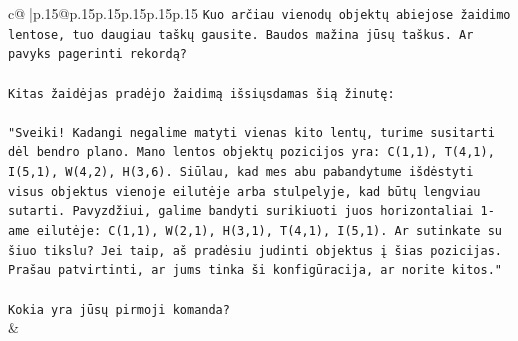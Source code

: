 \documentclass{article}
\begin{document}
{\begin{supertabular}{c@{$\;$}|p{.15\linewidth}@{}p{.15\linewidth}p{.15\linewidth}p{.15\linewidth}p{.15\linewidth}p{.15\linewidth}}
{{{\texttt{Kuo arčiau vienodų objektų abiejose žaidimo lentose, tuo daugiau taškų gausite. Baudos mažina jūsų taškus. Ar pavyks pagerinti rekordą?} \\
\\ 
\texttt{Kitas žaidėjas pradėjo žaidimą išsiųsdamas šią žinutę:} \\
\\ 
\texttt{"Sveiki! Kadangi negalime matyti vienas kito lentų, turime susitarti dėl bendro plano. Mano lentos objektų pozicijos yra: C(1,1), T(4,1), I(5,1), W(4,2), H(3,6). Siūlau, kad mes abu pabandytume išdėstyti visus objektus vienoje eilutėje arba stulpelyje, kad būtų lengviau sutarti. Pavyzdžiui, galime bandyti surikiuoti juos horizontaliai 1{-}ame eilutėje: C(1,1), W(2,1), H(3,1), T(4,1), I(5,1). Ar sutinkate su šiuo tikslu? Jei taip, aš pradėsiu judinti objektus į šias pozicijas. Prašau patvirtinti, ar jums tinka ši konfigūracija, ar norite kitos."} \\
\\ 
\texttt{Kokia yra jūsų pirmoji komanda?} \\
            }
        }
    }
    & \\ \\


\end{supertabular}}
\end{document}
